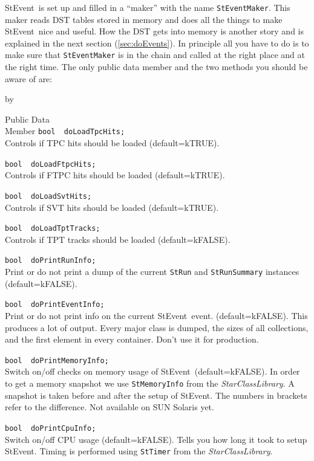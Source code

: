 \documentclass[twoside]{article}
\newcommand{\name}[1]{\textsl{#1}}%
\newcommand{\StEvent}{\textsf{StEvent}}
\newcommand{\entrylabel}[1]{\mbox{\textbf{{#1}}}\hfil}%
\newenvironment{entry}
{\begin{list}{}%
    {\renewcommand{\makelabel}{\entrylabel}%
     \setlength{\labelwidth}{90pt}%
     \setlength{\leftmargin}{\labelwidth}
     \advance\leftmargin by \labelsep%
      }%
    }%
  {\end{list}}
\newcommand{\Entrylabel}[1]%
{\raisebox{0pt}[1ex][0pt]{\makebox[\labelwidth][l]%
    {\parbox[t]{\labelwidth}{\hspace{0pt}\textbf{{#1}}}}}}
\newenvironment{Entry}%
{\renewcommand{\entrylabel}{\Entrylabel}\begin{entry}}%
  {\end{entry}}
\begin{document}
\StEvent\ is set up and filled in a ``maker'' with the name
\texttt{StEventMaker}.  This maker reads DST tables stored in memory
and does all the things to make \StEvent\ nice and useful. How the DST
gets into memory is another story and is explained in the next section
(\ref{sec:doEvents}).  In principle all you have to do is to make sure
that \texttt{StEventMaker} is in the chain and called at the right
place and at the right time.  The only public data member and the two
methods you should be aware of are:
\begin{Entry}
    
\item[Public Data\\ Member]
    \verb+bool  doLoadTpcHits;+\\
    Controls if TPC hits should be loaded (default=kTRUE).
    
    \verb+bool  doLoadFtpcHits;+\\
    Controls if FTPC hits should be loaded (default=kTRUE).
    
    \verb+bool  doLoadSvtHits; +\\
    Controls if SVT hits should be loaded (default=kTRUE).
                              
    \verb+bool  doLoadTptTracks;+\\
    Controls if TPT tracks should be loaded (default=kFALSE).

\verb+bool  doPrintRunInfo;+\\
    Print or do not print a dump of the current \texttt{StRun} and
    \texttt{StRunSummary} instances (default=kFALSE).
    
    \verb+bool  doPrintEventInfo;+\\
    Print or do not print info on the current \StEvent\ event.
    (default=kFALSE).  This produces a lot of output. Every major
    class is dumped, the sizes of all collections, and the first
    element in every container. Don't use it for production.
    
    \verb+bool  doPrintMemoryInfo;+\\
    Switch on/off checks on memory usage of \StEvent\
    (default=kFALSE).  In order to get a memory snapshot we use
    \texttt{StMemoryInfo} from the \name{StarClassLibrary}.  A
    snapshot is taken before and after the setup of \StEvent.  The
    numbers in brackets refer to the difference. Not available on SUN
    Solaris yet.
    
    \verb+bool  doPrintCpuInfo;+\\
    Switch on/off CPU usage (default=kFALSE). Tells you how long it
    took to setup \StEvent. Timing is performed using \texttt{StTimer}
    from the \name{StarClassLibrary}.
    

\end{Entry}
\end{document}
